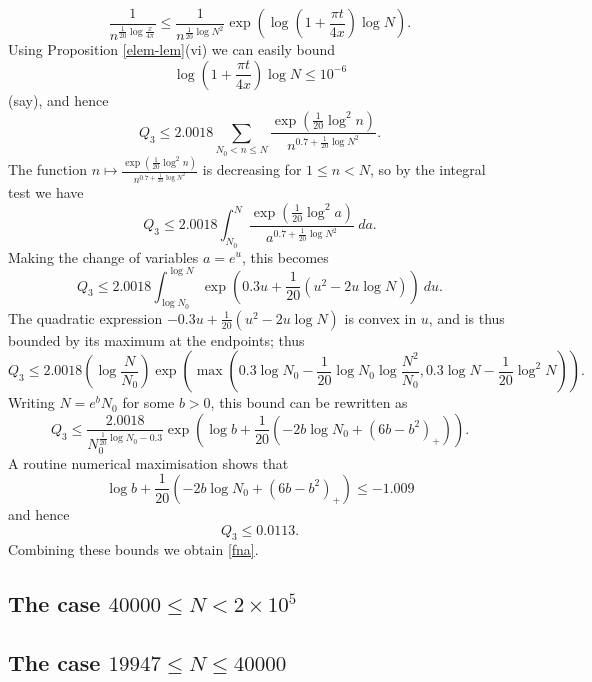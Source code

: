 $$ \frac{1}{n^{\frac{1}{20} \log \frac{x}{4\pi}}} \leq \frac{1}{n^{\frac{1}{20} \log N^2}} \exp(\log(1 + \frac{\pi t}{4x}) \log N).$$
Using Proposition \ref{elem-lem}(vi) we can easily bound
$$ \log(1 + \frac{\pi t}{4x}) \log N \leq 10^{-6}$$
(say), and hence
$$ Q_3 \leq 2.0018 \sum_{N_0 < n \leq N} \frac{\exp( \frac{1}{20} \log^2 n)}{n^{0.7 + \frac{1}{20} \log N^2}}.$$
The function $n \mapsto \frac{\exp( \frac{1}{20} \log^2 n)}{n^{0.7 + \frac{1}{20} \log N^2}}$ is decreasing for $1 \leq n < N$, so by the integral test we have
$$ Q_3 \leq 2.0018 \int_{N_0}^N \frac{\exp( \frac{1}{20} \log^2 a)}{a^{0.7 + \frac{1}{20} \log N^2}}\ da.$$
Making the change of variables $a = e^u$, this becomes
$$ Q_3 \leq 2.0018 \int_{\log N_0}^{\log N} \exp( 0.3 u + \frac{1}{20} (u^2 - 2u \log N) )\ du.$$
The quadratic expression $- 0.3 u + \frac{1}{20} (u^2 - 2u \log N)$ is convex in $u$, and is thus bounded by its maximum at the endpoints; thus
$$ Q_3 \leq 2.0018 (\log \frac{N}{N_0}) \exp( \max( 0.3 \log N_0 -\frac{1}{20} \log N_0 \log \frac{N^2}{N_0}, 0.3 \log N - \frac{1}{20} \log^2 N ) ).$$
Writing $N = e^b N_0$ for some $b>0$, this bound can be rewritten as 
$$ Q_3 \leq \frac{2.0018}{N_0^{\frac{1}{20} \log N_0 - 0.3}} \exp( \log b + \frac{1}{20} ( -2b \log N_0 + (6b-b^2)_+ ) ).$$
A routine numerical maximisation shows that
$$ \log b + \frac{1}{20} ( -2b \log N_0 + (6b-b^2)_+ ) \leq -1.009$$
and hence
$$ Q_3 \leq 0.0113.$$
Combining these bounds we obtain \eqref{fna}.





\subsection{The case $40000 \leq N < 2 \times 10^5$}




\subsection{The case $19947 \leq N \leq 40000$}
